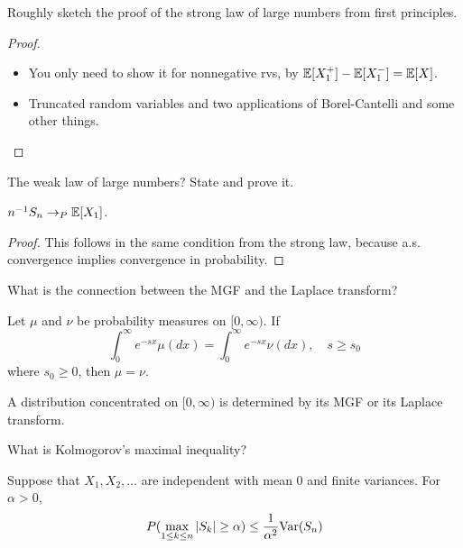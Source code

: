 \documentclass[avery5388,grid,frame]{flashcards}
\begin{document}
\begin{flashcard}
    {Roughly sketch the proof of the strong law of large numbers from first principles.}
    \begin{proof}
        \begin{itemize}
            \item You only need to show it for nonnegative rvs, by $\mathbb{E}[X_1^+] - \mathbb{E}[X_1^-] = \mathbb{E}[X]$.
            \item Truncated random variables and two applications of Borel-Cantelli and some other things.
        \end{itemize}
    \end{proof}
\end{flashcard}


\begin{flashcard}
    {The weak law of large numbers? State and prove it.}
    \begin{theorem}
        $n^{-1} S_n \rightarrow_P \mathbb{E}[X_1]$.
    \end{theorem}

    \begin{proof}
        This follows in the same condition from the strong law, because a.s. convergence implies convergence in probability.
    \end{proof}
\end{flashcard}


\begin{flashcard}
    {What is the connection between the MGF and the Laplace transform?}
    \begin{theorem}
        Let $\mu$ and $\nu$ be probability measures on $[0,\infty)$. If
        $$\int_0^\infty e^{-sx} \mu(dx) = \int_0^\infty e^{-sx} \nu(dx), \quad s \geq s_0$$
        where $s_0 \geq 0$, then $\mu = \nu$.
    \end{theorem}
    \begin{remark}
        A distribution concentrated on $[0,\infty)$ is determined by its MGF or its Laplace transform.
    \end{remark}
\end{flashcard}


\begin{flashcard}
    {What is Kolmogorov's maximal inequality?}
    \begin{theorem}
        Suppose that $X_1, X_2, \dots$ are independent with mean 0 and finite variances. For $\alpha > 0$,
        $$P( \max_{1 \leq k \leq n} |S_k| \geq \alpha) \leq \frac 1 {\alpha^2} \text{Var}(S_n)$$
    \end{theorem}
\end{flashcard}
\end{document}
